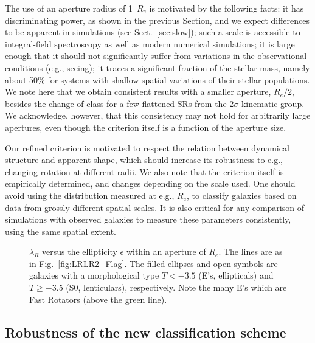 \documentclass[useAMS,usenatbib,usegraphicx]{mn2e}
\begin{document}
The use of an aperture radius of 1~$R_e$ is motivated by the following facts: 
it has discriminating power, as shown in the previous Section, and we 
expect differences to be apparent in simulations (see Sect.~\ref{sec:slow}); such a scale is 
accessible to integral-field spectroscopy as well as modern numerical simulations; it
is large enough that it should not significantly suffer from variations in the 
observational conditions (e.g., seeing); it traces a significant fraction of
the stellar mass, namely about 50\% for systems with shallow spatial variations
of their stellar populations. 
We note here that we obtain consistent results with a smaller aperture, $R_e/2$, 
besides the change of class for a few flattened SRs from the 2$\sigma$ kinematic group.
We acknowledge, however, that this consistency may not hold for arbitrarily
large apertures, even though the criterion itself is a function of the aperture size.

Our refined criterion is motivated to respect the relation between dynamical
structure and apparent shape, which should increase its robustness to e.g.,
changing rotation at different radii. We also note that the criterion itself is
empirically determined, and changes depending on the scale used. One should
avoid using the distribution measured at e.g., $R_e$, to classify galaxies based
on data from grossly different spatial scales. It is also critical for any comparison 
of simulations with observed galaxies to measure these parameters consistently, 
using the same spatial extent.
\begin{figure}
\centering
{}
\caption{$\lambda_R$ versus the ellipticity $\epsilon$ 
within an aperture of $R_e$. The lines are as in Fig.~\ref{fig:LRLR2_Flag}. The filled ellipses and open symbols
are galaxies with a morphological type $T < -3.5$ (E's, ellipticals) and $T \geq -3.5$
(S0, lenticulars), respectively. Note the many E's which are Fast Rotators
(above the green line).}
\label{fig:Types}
\end{figure}

\subsection{Robustness of the new classification scheme}
\end{document}
